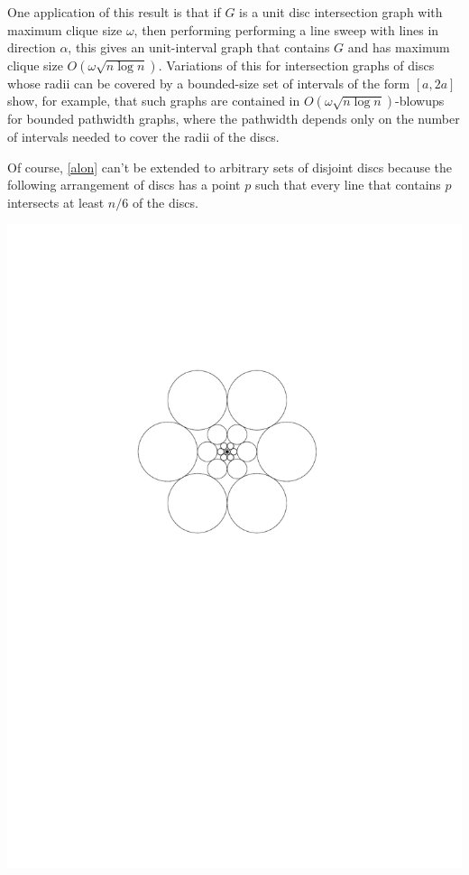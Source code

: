 \documentclass{patmorin}
\begin{document}
One application of this result is that if $G$ is a unit disc intersection graph with maximum clique size $\omega$, then performing performing a line sweep with lines in direction $\alpha$, this gives an unit-interval graph that contains $G$ and has maximum clique size $O(\omega \sqrt{n\log n})$.  Variations of this for intersection graphs of discs whose radii can be covered by a bounded-size set of intervals of the form $[a,2a]$ show, for example, that such graphs are contained in $O(\omega\sqrt{n\log n})$-blowups for bounded pathwidth graphs, where the pathwidth depends only on the number of intervals needed to cover the radii of the discs.

Of course, \cref{alon} can't be extended to arbitrary sets of disjoint discs because the following arrangement of discs has a point $p$ such that every line that contains $p$ intersects at least $n/6$ of the discs.

\begin{center}
  \includegraphics{figs/spider}
\end{center}
\end{document}
